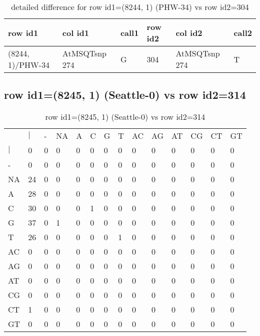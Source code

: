 \begin{center}
\begin{longtable}{|l|l|l|l|l|l|}
\caption{detailed difference for row id1=(8244, 1) (PHW-34) vs row id2=304} \label{table_dm185}\\
\hline
row id1&col id1&call1&row id2&col id2&call2\\
\hline
(8244, 1)/PHW-34&AtMSQTsnp 274&G&304&AtMSQTsnp 274&T\\
\hline
\end{longtable}
\end{center}

\subsection{row id1=(8245, 1) (Seattle-0) vs row id2=314}
\begin{center}
\begin{longtable}{|l|l|l|l|l|l|l|l|l|l|l|l|l|l|}
\caption{row id1=(8245, 1) (Seattle-0) vs row id2=314} \label{table_dm186}\\
\hline
\\
\hline
&$|$&-&NA&A&C&G&T&AC&AG&AT&CG&CT&GT\\
$|$&0&0&0&0&0&0&0&0&0&0&0&0&0\\
-&0&0&0&0&0&0&0&0&0&0&0&0&0\\
NA&24&0&0&0&0&0&0&0&0&0&0&0&0\\
A&28&0&0&0&0&0&0&0&0&0&0&0&0\\
C&30&0&0&0&1&0&0&0&0&0&0&0&0\\
G&37&0&1&0&0&0&0&0&0&0&0&0&0\\
T&26&0&0&0&0&0&1&0&0&0&0&0&0\\
AC&0&0&0&0&0&0&0&0&0&0&0&0&0\\
AG&0&0&0&0&0&0&0&0&0&0&0&0&0\\
AT&0&0&0&0&0&0&0&0&0&0&0&0&0\\
CG&0&0&0&0&0&0&0&0&0&0&0&0&0\\
CT&1&0&0&0&0&0&0&0&0&0&0&0&0\\
GT&0&0&0&0&0&0&0&0&0&0&0&0&0\\
\hline
\end{longtable}
\end{center}

